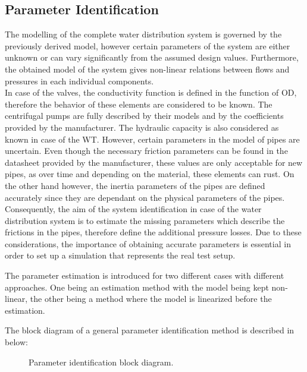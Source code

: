 \subsection{Parameter Identification}
\label{SubSecEstimation}

The modelling of the complete water distribution system is governed by the previously derived model, however certain parameters of the system are either unknown or can vary significantly from the assumed design values. Furthermore, the obtained model of the system gives non-linear relations between flows and pressures in each individual components. 
\\
In case of the valves, the conductivity function is defined in the function of OD, therefore the behavior of these elements are considered to be known. The centrifugal pumps are fully described by their models and by the coefficients provided by the manufacturer. The hydraulic capacity is also considered as known in case of the WT. However, certain parameters in the model of pipes are uncertain. Even though the necessary friction parameters can be found in the datasheet provided by the manufacturer, these values are only acceptable for new pipes, as over time and depending on the material, these elements can rust. On the other hand however, the inertia parameters of the pipes are defined accurately since they are dependant on the physical parameters of the pipes. 
\\
Consequently, the aim of the system identification in case of the water distribution system is to estimate the missing parameters which describe the frictions in the pipes, therefore define the additional pressure losses. Due to these considerations, the importance of obtaining accurate parameters is essential in order to set up a simulation that represents the real test setup. 

The parameter estimation is introduced for two different cases with different approaches. One being an estimation method with the model being kept non-linear, the other being a method where the model is  linearized before the estimation. 

The block diagram of a general parameter identification method is described in  below: 

\begin{figure}[H]
\centering
 
\caption{Parameter identification block diagram. }
\label{fig:parame_block}
\end{figure}

